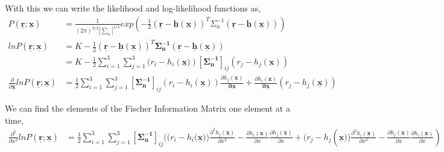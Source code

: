 \documentclass[a4 paper]{article}
\begin{document}
With this we can write the likelihood and log-likelihood functions as,
\begin{align*}
P(\mathbf{\underline{r}}; \mathbf{\underline{x}}) &= \frac{1}{(2\pi)^{3/2}|\sum_{n}|^{1/2}}exp(-\frac{1}{2}(\mathbf{\underline{r}}-\mathbf{\underline{h}(\mathbf{\underline{x}})})^{T}\Sigma_{n}^{-1}(\mathbf{\underline{r}}-\mathbf{\underline{h}(\mathbf{\underline{x}})}))
\\ ln P(\mathbf{\underline{r}}; \mathbf{\underline{x}}) &=  K -\frac{1}{2}(\mathbf{\underline{r}}-\mathbf{\underline{h}(\mathbf{\underline{x}})})^{T}\mathbf{\Sigma_{n}^{-1}}(\mathbf{\underline{r}}-\mathbf{\underline{h}(\mathbf{\underline{x}})})
\\ &= K - \frac{1}{2} \sum_{i =1}^{3}\sum_{j=1}^{3}(r_{i} - h_{i}(\mathbf{\underline{x})})[\mathbf{\Sigma_{n}^{-1}}]_{ij}(r_{j} - h_{j}(\mathbf{\underline{x}}))
\\ \frac{\partial}{\partial\mathbf{\underline{x}}}ln P(\mathbf{\underline{r}}; \mathbf{\underline{x}}) &= \frac{1}{2}\sum_{i =1}^{3}\sum_{j=1}^{3} [\mathbf{\Sigma_{n}^{-1}}]_{ij}(r_{i} - h_{i}(\mathbf{\underline{x}}))\frac{\partial h_{j}(\mathbf{\underline{x}})}{\mathbf{\partial\underline{x}}} + \frac{\partial h_{i}(\mathbf{\underline{x}})}{\mathbf{\partial\underline{x}}}(r_{j} - h_{j}(\mathbf{\underline{x}}))
\end{align*}

We can find the elements of the Fischer Information Matrix one element at a time,
\begin{align*}
\frac{\partial^{2}}{\partial x^{2}}ln P(\mathbf{\underline{r}}; \mathbf{\underline{x}})  &= \frac{1}{2}\sum_{i =1}^{3}\sum_{j=1}^{3} [\mathbf{\Sigma_{n}^{-1}}]_{ij} ((r_{i} - h_{i}(\mathbf{\underline{x}))}\frac{\partial^{2} h_{j}(\mathbf{\underline{x}})}{\partial x^{2}}-\frac{\partial h_{i}(\mathbf{\underline{x}})}{\partial x}\frac{\partial h_{j}(\mathbf{\underline{x}})}{\partial x} + (r_{j} - h_{j}(\mathbf{\underline{x}))}\frac{\partial^{2} h_{i}(\mathbf{\underline{x}})}{\partial x^{2}}-\frac{\partial h_{j}(\mathbf{\underline{x}})}{\partial x}\frac{\partial h_{i}(\mathbf{\underline{x}})}{\partial x})
\end{align*}

\vspace{-3.5em}
\end{document}
